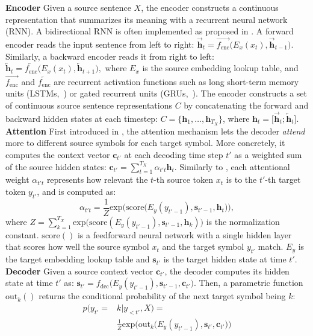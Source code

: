 \documentclass[11pt,letterpaper]{article}
\newcommand{\ti}{\textit}
\newcommand{\tb}{\textbf}
\newcommand{\mb}{\mathbf}
\newcommand{\nrr}{\color{black}}
\newcommand{\rv}{\overrightarrow}
\newcommand{\lv}{\overleftarrow}
\newcommand{\fenc}{\rv{f_\text{enc}}}
\newcommand{\benc}{\lv{f_\text{enc}}}
\newcommand{\dec}{f_\text{dec}}
\newcommand{\fscore}{\text{score}}
\newcommand{\fexp}{\text{exp}}
\newcommand{\foutk}{\text{out}_k}
\newcommand{\foutkp}{\text{out}_k()}
\newcommand{\srcemb}{E_x}
\newcommand{\trgemb}{E_y}
\begin{document}
\noindent\textbf{Encoder} Given a source sentence $X$, the encoder constructs a continuous representation that summarizes its meaning with a recurrent neural network (RNN). A bidirectional RNN is often implemented as proposed in \cite{Bahdanau:15}. A forward encoder reads the input sentence from left to right: $\rv{\mb{h}}_t = \fenc\big(\srcemb(x_t), \rv{\mb{h}}_{t-1}\big).$ Similarly, a backward encoder reads it from right to left: $\lv{\mb{h}}_t = \benc\big(\srcemb(x_t), \lv{\mb{h}}_{t+1}\big),$ where $E_x$ is the source embedding lookup table, and $\fenc$ and $\benc$ are recurrent activation functions such as long short-term memory units (LSTMs,~\cite{Hochreiter:97}) or gated recurrent units (GRUs,~\cite{Cho:14b}). The encoder constructs a set of continuous source sentence representations $C$ by concatenating the forward and backward hidden states at each timestep: $C=\big\{\mb{h}_1,\dots,\mb{h}_{T_X}\big\}$, where $\mb{h}_t=\big[\rv{\mb{h}}_t;\lv{\mb{h}}_t\big]$. \\

\noindent\textbf{Attention} First introduced in \cite{Bahdanau:15}, the attention mechanism lets the decoder \ti{attend} more to different source symbols for each target symbol. More concretely, it computes the context vector $\mb{c}_{t'}$ at each decoding time step $t'$ as a weighted sum of the source hidden states: $\mb{c}_{t'} = \sum_{t=1}^{T_X}{\alpha_{{t'}t}\mb{h}_t}.$ {\nrr Similarly to \cite{Chung:16,Firat:16}}, each attentional weight $\alpha_{{t'}t}$ represents how relevant the $t$-th source token $x_t$ is to the $t'$-th target token $y_{t'}$, and is computed as: 
\begin{equation}
\alpha_{t't}=\frac {1} {Z} \fexp\bigg(\fscore\Big(\trgemb(y_{t'-1}),\mb{s}_{t'-1},\mb{h}_{t}\Big)\bigg),
\end{equation}
where $Z={\sum_{k=1}^{T_X}{\fexp\big(\fscore(\trgemb(y_{t'-1}),\mb{s}_{t'-1},\mb{h}_{k})\big)}}$ is the normalization constant. $\fscore()$ is a feedforward neural network with a single hidden layer that scores how well the source symbol $x_t$ and the target symbol $y_{t'}$ match. $\trgemb$ is the target embedding lookup table and $\mb{s}_{t'}$ is the target hidden state at time $t'$. \\

\noindent\tb{Decoder} Given a source context vector $\mb{c}_{t'}$, the decoder computes its hidden state at time $t'$ as: $\mb{s}_{t'} = \dec\big(\trgemb(y_{t'-1}), \mb{s}_{t'-1}, \mb{c}_{t'}\big).$ Then, a parametric function $\foutkp$ returns the conditional probability of the next target symbol being $k$: 
\begin{equation}
\begin{split}
 p(y_{t'}= & k|y_{<t'},X) = \\ 
& \frac{1}{Z}\fexp\bigg(\foutk\Big(\trgemb(y_{t'-1}),\mb{s}_{t'},\mb{c}_{t'}\Big)\bigg)
\end{split}
\end{equation}
\end{document}
